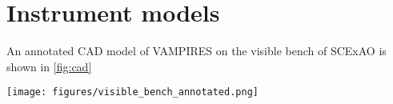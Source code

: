 \section{Instrument models\label{sec:models}}

An annotated CAD model of VAMPIRES on the visible bench of SCExAO is shown in \autoref{fig:cad}


\begin{figure*}
    \centering
    \texttt{[image: figures/visible\_bench\_annotated.png]}
    \caption{SCExAO visible bench including the PyWFS, FIRST injection, and VAMPIRES. VAMPIRES optics are labeled in orange and FIRST/PyWFS optics are labeled in red. The total size of the optical table shown is \SI{120}{\cm} by \SI{90}{\cm}. Parts of the baffling around VAMPIRES optics, as well as the optical bench enclosure, are hidden for clarity.\label{fig:cad}}
\end{figure*}
